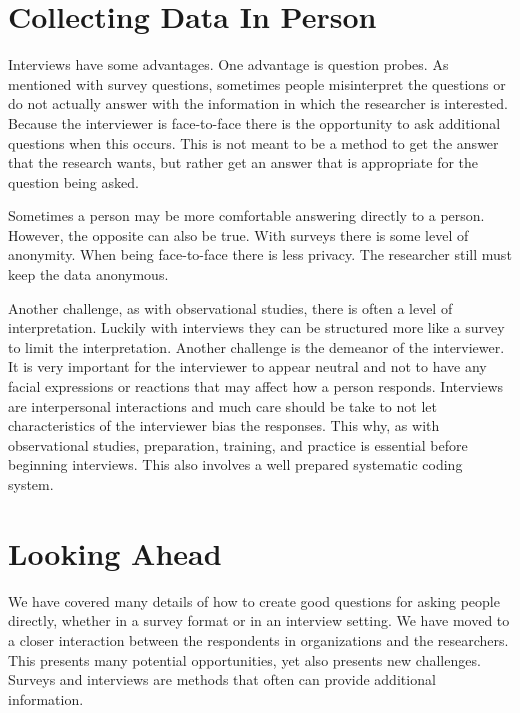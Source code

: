 \documentclass[]{book}
\theoremstyle{definition}
\theoremstyle{definition}
\theoremstyle{definition}
\theoremstyle{remark}
\begin{document}
\hypertarget{collecting-data-in-person}{%
\section{Collecting Data In Person}\label{collecting-data-in-person}}

Interviews have some advantages. One advantage is question probes. As
mentioned with survey questions, sometimes people misinterpret the
questions or do not actually answer with the information in which the
researcher is interested. Because the interviewer is face-to-face there
is the opportunity to ask additional questions when this occurs. This is
not meant to be a method to get the answer that the research wants, but
rather get an answer that is appropriate for the question being asked.

Sometimes a person may be more comfortable answering directly to a
person. However, the opposite can also be true. With surveys there is
some level of anonymity. When being face-to-face there is less privacy.
The researcher still must keep the data anonymous.

Another challenge, as with observational studies, there is often a level
of interpretation. Luckily with interviews they can be structured more
like a survey to limit the interpretation. Another challenge is the
demeanor of the interviewer. It is very important for the interviewer to
appear neutral and not to have any facial expressions or reactions that
may affect how a person responds. Interviews are interpersonal
interactions and much care should be take to not let characteristics of
the interviewer bias the responses. This why, as with observational
studies, preparation, training, and practice is essential before
beginning interviews. This also involves a well prepared systematic
coding system.

\hypertarget{looking-ahead-8}{%
\section{Looking Ahead}\label{looking-ahead-8}}

We have covered many details of how to create good questions for asking
people directly, whether in a survey format or in an interview setting.
We have moved to a closer interaction between the respondents in
organizations and the researchers. This presents many potential
opportunities, yet also presents new challenges. Surveys and interviews
are methods that often can provide additional information.
\end{document}
